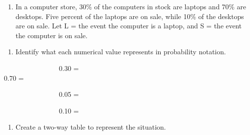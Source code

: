 \documentclass[
]{report}
\providecommand{\tightlist}{%
  \setlength{\itemsep}{0pt}\setlength{\parskip}{0pt}}
\begin{document}
\newpage

\begin{enumerate}
\def\labelenumi{\arabic{enumi}.}
\setcounter{enumi}{9}
\tightlist
\item
  In a computer store, 30\% of the computers in stock are laptops and 70\% are desktops. Five percent of the laptops are on sale, while 10\% of the desktops are on sale. Let L = the event the computer is a laptop, and S = the event the computer is on sale.
  \vspace{0.1in}
\end{enumerate}

\begin{enumerate}
\def\labelenumi{\alph{enumi}.}
\tightlist
\item
  Identify what each numerical value represents in probability notation.
  \vspace{.1in}
\end{enumerate}

~~~~~~~~~~~~~~~~0.30 = \vspace{.2in}\\
\hspace*{0.333em}\hspace*{0.333em}\hspace*{0.333em}\hspace*{0.333em}\hspace*{0.333em}\hspace*{0.333em}\hspace*{0.333em}\hspace*{0.333em}\hspace*{0.333em}\hspace*{0.333em}\hspace*{0.333em}\hspace*{0.333em}\hspace*{0.333em}\hspace*{0.333em}\hspace*{0.333em}\hspace*{0.333em}0.70 =

\vspace{.2in}

~~~~~~~~~~~~~~~~0.05 =

\vspace{.2in}

~~~~~~~~~~~~~~~~0.10 =

\vspace{.2in}

\begin{enumerate}
\def\labelenumi{\alph{enumi}.}
\setcounter{enumi}{1}
\tightlist
\item
  Create a two-way table to represent the situation.
\end{enumerate}
\end{document}
